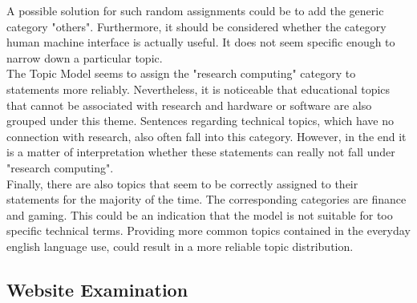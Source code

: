A possible solution for such random assignments could be to add the generic category "others".
Furthermore, it should be considered whether the category human machine interface is actually useful.
It does not seem specific enough to narrow down a particular topic.
\\
The Topic Model seems to assign the "research computing" category to statements more reliably.
Nevertheless, it is noticeable that educational topics that cannot be associated with research and hardware or software are also grouped under this theme.
Sentences regarding technical topics, which have no connection with research, also often fall into this category.
However, in the end it is a matter of interpretation whether these statements can really not fall under "research computing".
\\
Finally, there are also topics that seem to be correctly assigned to their statements for the majority of the time.
The corresponding categories are finance and gaming.
This could be an indication that the model is not suitable for too specific technical terms.
Providing more common topics contained in the everyday english language use, could result in a more reliable topic distribution.

\subsection{Website Examination}

